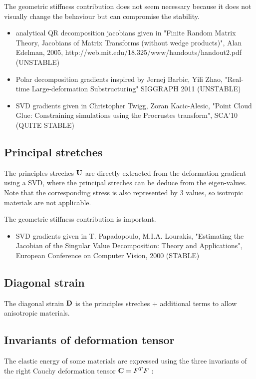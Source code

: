 The geometric stiffness contribution does not seem necessary because it does not visually change the behaviour but can compromise the stability.
\begin{itemize}
\item analytical QR decomposition jacobians given in "Finite Random Matrix Theory, Jacobians of Matrix Transforms (without wedge products)", Alan Edelman, 2005, http://web.mit.edu/18.325/www/handouts/handout2.pdf (UNSTABLE)
\item Polar decomposition gradients inspired by Jernej Barbic, Yili Zhao, "Real-time Large-deformation Substructuring" SIGGRAPH 2011 (UNSTABLE)
\item SVD gradients given in Christopher Twigg, Zoran Kacic-Alesic, "Point Cloud Glue: Constraining simulations using the Procrustes transform", SCA'10 (QUITE STABLE)
\end{itemize}

\subsection{Principal stretches}

The principles streches $\mathbf{{U}}$ are directly extracted from the deformation gradient using a SVD, where the principal streches can be deduce from the eigen-values.
Note that the corresponding stress is also represented by 3 values, so isotropic materials are not applicable.

The geometric stiffness contribution is important.
\begin{itemize}
\item SVD gradients given in T. Papadopoulo, M.I.A. Lourakis, "Estimating the Jacobian of the Singular Value Decomposition: Theory and Applications", European Conference on Computer Vision, 2000 (STABLE)
\end{itemize}

\subsection{Diagonal strain}

The diagonal strain $\mathbf{{D}}$ is the principles streches + additional terms to allow anisotropic materials. 


\subsection{Invariants of deformation tensor}

The elastic energy of some materials are expressed using the three invariants of the right Cauchy deformation tensor $\mathbf{{C}}=F^T F$ :

